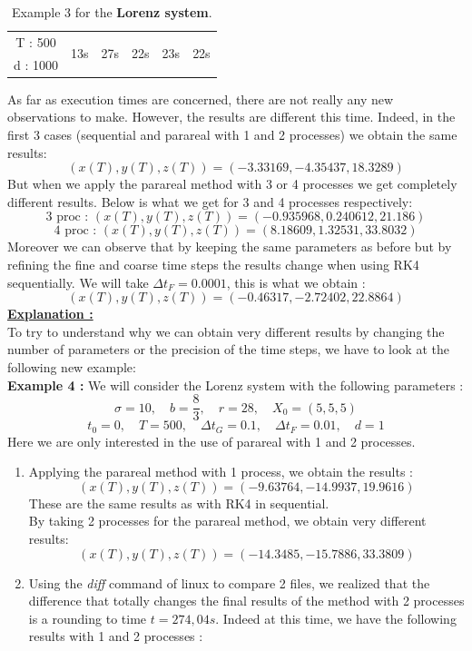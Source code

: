 \begin{enumerate}[label=\textbullet]
\begin{itemize}[label=-]
\begin{table}[H]
\begin{tabular}{| c || c | c | c | c | c |}
				\hline 
				T : 500 & \multirow{2}{1.5 cm}{13s} & \multirow{2}{1.5 cm}{27s} & \multirow{2}{1.5 cm}{22s} & \multirow{2}{1.5 cm}{23s} & \multirow{2}{1.5 cm}{22s} \\
				d : 1000 & & & & & \\
				\hline 
			\end{tabular}
			\caption{Example 3 for the \textbf{Lorenz system}.}
			\label{time_lorenz_3}
		\end{table}
		As far as execution times are concerned, there are not really any new observations to make. However, the results are different this time. Indeed, in the first 3 cases (sequential and  parareal with 1 and 2 processes) we obtain the same results:
		$$(x(T),y(T),z(T))=(-3.33169, -4.35437, 18.3289)$$
		But when we apply the parareal method with 3 or 4 processes we get completely different results. Below is what we get for 3 and 4 processes respectively:
		$$\text{3 proc : } (x(T),y(T),z(T))=(-0.935968, 0.240612,21.186)$$
		$$\text{4 proc : } (x(T),y(T),z(T))=(8.18609,1.32531,33.8032)$$
		Moreover we can observe that by keeping the same parameters as before but by refining the fine and coarse time steps the results change when using RK4 sequentially. We will take $\Delta t_F=0.0001$, this is what we obtain :
		$$(x(T),y(T),z(T))=(-0.46317,-2.72402,22.8864)$$
		\underline{\textbf{Explanation :}} \\
		To try to understand why we can obtain very different results by changing the number of parameters or the precision of the time steps, we have to look at the following new example: \\
		\textbf{Example 4 :} We will consider the Lorenz system with the following parameters :
		$$\sigma=10, \quad b=\frac{8}{3}, \quad r=28, \quad X_0=(5,5,5)$$
		$$t_0=0, \quad T=500, \quad \Delta t_G=0.1, \quad \Delta t_F=0.01, \quad d=1$$
		Here we are only interested in the use of parareal with 1 and 2 processes.
		\begin{enumerate}[label=\ding{213}]
			\item Applying the parareal method with 1 process, we obtain the results :
			$$(x(T),y(T),z(T))=(-9.63764,-14.9937,19.9616)$$
			These are the same results as with RK4 in sequential. \\
			By taking 2 processes for the parareal method, we obtain very different results:
			$$(x(T),y(T),z(T))=(-14.3485,-15.7886,33.3809)$$
			\item Using the \textit{diff} command of linux to compare 2 files, we realized that the difference that totally changes the final results of the method with 2 processes is a rounding to time $t=274,04s$. Indeed at this time, we have the following results with 1 and 2 processes :

\end{enumerate}
\end{itemize}
\end{enumerate}
